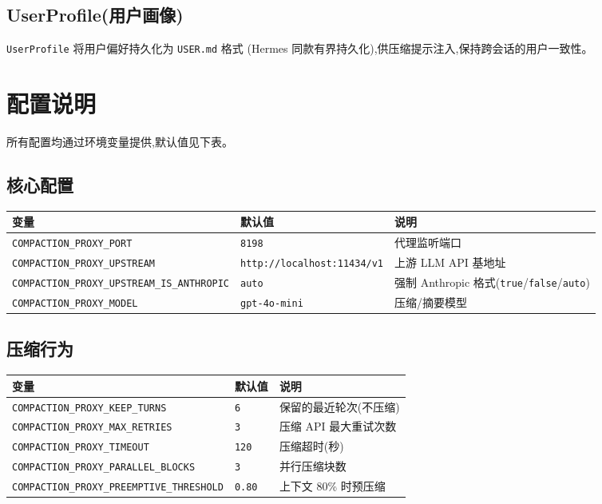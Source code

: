 \documentclass[11pt,a4paper]{article}
\begin{document}
\subsection{UserProfile(用户画像)}

\texttt{UserProfile} 将用户偏好持久化为 \texttt{USER.md} 格式
(Hermes 同款有界持久化),供压缩提示注入,保持跨会话的用户一致性。

\section{配置说明}

所有配置均通过环境变量提供,默认值见下表。

\subsection{核心配置}

\begin{longtable}{@{}llp{7cm}@{}}
  \toprule
  变量 & 默认值 & 说明 \\
  \midrule
  \texttt{COMPACTION\_PROXY\_PORT} & \texttt{8198} & 代理监听端口 \\
  \texttt{COMPACTION\_PROXY\_UPSTREAM} & \texttt{http://localhost:11434/v1} & 上游 LLM API 基地址 \\
  \texttt{COMPACTION\_PROXY\_UPSTREAM\_IS\_ANTHROPIC} & \texttt{auto} & 强制 Anthropic 格式(\texttt{true}/\texttt{false}/\texttt{auto}) \\
  \texttt{COMPACTION\_PROXY\_MODEL} & \texttt{gpt-4o-mini} & 压缩/摘要模型 \\
  \bottomrule
\end{longtable}

\subsection{压缩行为}

\begin{longtable}{@{}llp{7cm}@{}}
  \toprule
  变量 & 默认值 & 说明 \\
  \midrule
  \texttt{COMPACTION\_PROXY\_KEEP\_TURNS} & \texttt{6} & 保留的最近轮次(不压缩) \\
  \texttt{COMPACTION\_PROXY\_MAX\_RETRIES} & \texttt{3} & 压缩 API 最大重试次数 \\
  \texttt{COMPACTION\_PROXY\_TIMEOUT} & \texttt{120} & 压缩超时(秒) \\
  \texttt{COMPACTION\_PROXY\_PARALLEL\_BLOCKS} & \texttt{3} & 并行压缩块数 \\
  \texttt{COMPACTION\_PROXY\_PREEMPTIVE\_THRESHOLD} & \texttt{0.80} & 上下文 80\% 时预压缩 \\
  \bottomrule
\end{longtable}
\end{document}
